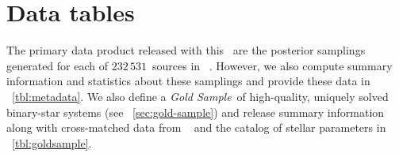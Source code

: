 \documentclass[modern]{aastex63}
\newcommand{\nsources}{\ensuremath{232\,531}}
\newcommand{\goldsample}{\textit{Gold Sample}}
\begin{document}
\section{Data tables}
\label{sec:datatables}

The primary data product released with this \documentname\ are the posterior
samplings generated for each of \nsources\ sources in \apogee\ .
However, we also compute summary information and statistics about these
samplings and provide these data in \tablename~\ref{tbl:metadata}.
We also define a \goldsample\ of high-quality, uniquely solved binary-star
systems (see \sectionname~\ref{sec:gold-sample}) and release summary information
along with cross-matched data from \gaia\  and the 
catalog of stellar parameters in \tablename~\ref{tbl:goldsample}.







\end{document}

